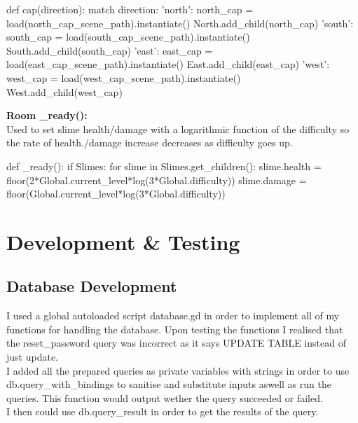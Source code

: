 \documentclass{article}
\begin{document}
        \begin{python}
def cap(direction):
   match direction:
      'north':
	 north_cap = load(north_cap_scene_path).instantiate()
	 North.add_child(north_cap)
      'south':
	 south_cap = load(south_cap_scene_path).instantiate()
	 South.add_child(south_cap)
      'east':
	 east_cap = load(east_cap_scene_path).instantiate()
	 East.add_child(east_cap)
      'west':
	 west_cap = load(west_cap_scene_path).instantiate()
	 West.add_child(west_cap)
        \end{python}
        \textbf{Room \_ready():}\\
        Used to set slime health/damage with a logarithmic function of the difficulty so the rate of health./damage increase decreases as difficulty goes up.
        \begin{python}
def _ready():
   if Slimes:
      for slime in Slimes.get_children():
	 slime.health = floor(2*Global.current_level*log(3*Global.difficulty))
	 slime.damage = floor(Global.current_level*log(3*Global.difficulty))
        \end{python}
        \section{Development \& Testing}
        \subsection{Database Development}
        I used a global autoloaded script database.gd in order to implement all of my functions for handling the database. Upon testing the functions I realised that the reset\_password query was incorrect as it says UPDATE TABLE instead of just update.\\
        I added all the prepared queries as private variables with strings in order to use db.query\_with\_bindings to sanitise and substitute inputs aswell as run the queries. This function would output wether the query succeeded or failed.\\
        I then could use db.query\_result in order to get the results of the query.\\
\end{document}
